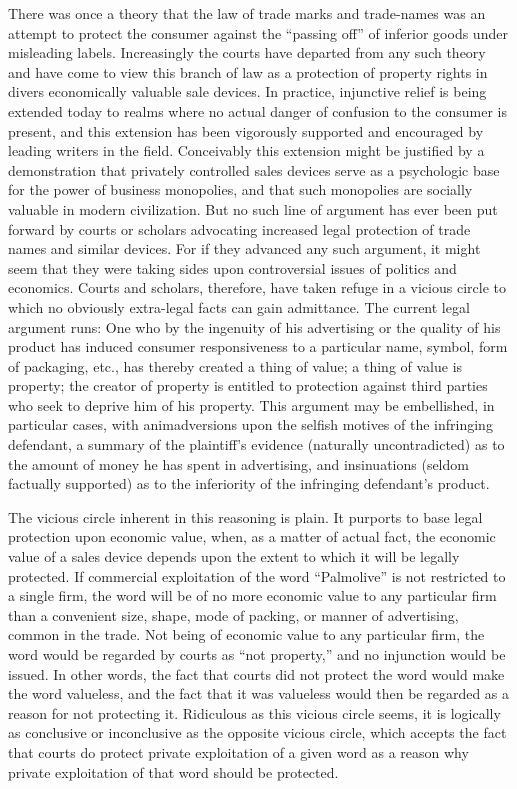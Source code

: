
There was once a theory that the law of trade marks and trade-names was an
attempt to protect the consumer against the ``passing off'' of inferior goods
under misleading labels. Increasingly the courts have departed from any such
theory and have come to view this branch of law as a protection of property
rights in divers economically valuable sale devices. In practice, injunctive
relief is being extended today to realms where no actual danger of confusion to
the consumer is present, and this extension has been vigorously supported and
encouraged by leading writers in the field. Conceivably this extension might be
justified by a demonstration that privately controlled sales devices serve as a
psychologic base for the power of business monopolies, and that such monopolies
are socially valuable in modern civilization. But no such line of argument has
ever been put forward by courts or scholars advocating increased legal
protection of trade names and similar devices. For if they advanced any such
argument, it might seem that they were taking sides upon controversial issues
of politics and economics. Courts and scholars, therefore, have taken refuge in
a vicious circle to which no obviously extra-legal facts can gain admittance.
The current legal argument runs: One who by the ingenuity of his advertising or
the quality of his product has induced consumer responsiveness to a particular
name, symbol, form of packaging, etc., has thereby created a thing of value; a
thing of value is property; the creator of property is entitled to protection
against third parties who seek to deprive him of his property. This argument
may be embellished, in particular cases, with animadversions upon the selfish
motives of the infringing defendant, a summary of the plaintiff's evidence
(naturally uncontradicted) as to the amount of money he has spent in
advertising, and insinuations (seldom factually supported) as to the
inferiority of the infringing defendant's product. 

The vicious circle inherent in this reasoning is plain. It purports to base
legal protection upon economic value, when, as a matter of actual fact, the
economic value of a sales device depends upon the extent to which it will be
legally protected. If commercial exploitation of the word ``Palmolive'' is not
restricted to a single firm, the word will be of no more economic value to any
particular firm than a convenient size, shape, mode of packing, or manner of
advertising, common in the trade. Not being of economic value to any particular
firm, the word would be regarded by courts as ``not property,'' and no
injunction would be issued. In other words, the fact that courts did not
protect the word would make the word valueless, and the fact that it was
valueless would then be regarded as a reason for not protecting it. Ridiculous
as this vicious circle seems, it is logically as conclusive or inconclusive as
the opposite vicious circle, which accepts the fact that courts do protect
private exploitation of a given word as a reason why private exploitation of
that word should be protected. 

